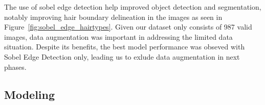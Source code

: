 The use of sobel edge detection help improved object detection and segmentation, notably improving hair boundary delineation in the images as seen in Figure~\ref{fig:sobel_edge_hairtypes}. Given our dataset only consists of 987 valid images, data augmentation was important in addressing the limited data situation. Despite its benefits, the best model performance was obseved with Sobel Edge Detection only, leading us to exlude data augmentation in next phases.

\subsection{Modeling}








